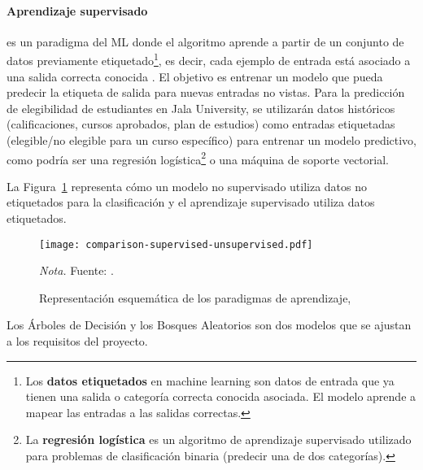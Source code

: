 \paragraph{Aprendizaje supervisado}
es un paradigma del ML donde el algoritmo aprende a partir de un conjunto de datos previamente etiquetado\footnote{Los \textbf{datos etiquetados} en machine learning son datos de entrada que ya tienen una salida o categoría correcta conocida asociada.
El modelo aprende a mapear las entradas a las salidas correctas.}, es decir, cada ejemplo de entrada está asociado a una salida correcta conocida \parencite{Bishop2006}.
El objetivo es entrenar un modelo que pueda predecir la etiqueta de salida para nuevas entradas no vistas.
Para la predicción de elegibilidad de estudiantes en Jala University, se utilizarán datos históricos (calificaciones, cursos aprobados, plan de estudios) como entradas etiquetadas (elegible/no elegible para un curso específico) para entrenar un modelo predictivo, como podría ser una regresión logística\footnote{La \textbf{regresión logística} es un algoritmo de aprendizaje supervisado utilizado para problemas de clasificación binaria (predecir una de dos categorías).} o una máquina de soporte vectorial.

La Figura~\ref{fig:mlComparison} representa cómo un modelo no supervisado utiliza datos no etiquetados para la clasificación y el aprendizaje supervisado utiliza datos etiquetados.

\begin{figure}
    \centering
    \caption{Representación esquemática de los paradigmas de aprendizaje, } \label{fig:mlComparison}
    \texttt{[image: comparison-supervised-unsupervised.pdf]}

    \vspace{0.5em}
    \begin{minipage}{\textwidth}
        \small\textit{Nota.} Fuente: \textcite{morimoto2021}.
    \end{minipage}
\end{figure}

Los Árboles de Decisión y los Bosques Aleatorios son dos modelos que se ajustan a los requisitos del proyecto.

